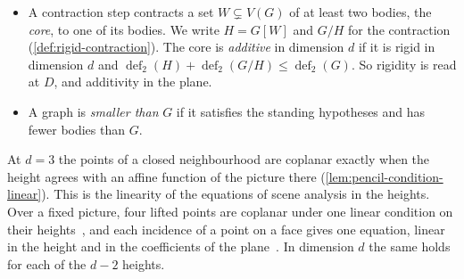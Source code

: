 \begin{itemize}
    rigid in every higher one (\cref{lem:deficiency-rigid-higher}). In
    particular a planar-rigid set is rigid in dimension $d$.
  \item A contraction step contracts a set $W \subsetneq V(G)$ of at
    least two bodies, the \emph{core}, to one of its bodies. We write
    $H = G[W]$ and $G/H$ for the contraction
    (\cref{def:rigid-contraction}). The core is \emph{additive} in
    dimension $d$ if it is rigid in dimension $d$ and
    $\operatorname{def}_2(H) + \operatorname{def}_2(G/H) \le
    \operatorname{def}_2(G)$. So rigidity is read at $D$, and additivity
    in the plane.
  \item A graph is \emph{smaller than} $G$ if it satisfies the standing
    hypotheses and has fewer bodies than $G$.
\end{itemize}

At $d = 3$ the points of a closed neighbourhood are coplanar exactly
when the height agrees with an affine function of the picture there
(\cref{lem:pencil-condition-linear}). This is the linearity of the
equations of scene analysis in the heights. Over a fixed picture, four
lifted points are coplanar under one linear condition on their
heights~\cite[p.~78]{whiteley1989}, and each incidence of a point on a
face gives one equation, linear in the height and in the coefficients
of the plane~\cite[eq.~(1), p.~80]{sugihara1984}. In dimension $d$ the
same holds for each of the $d - 2$ heights.

